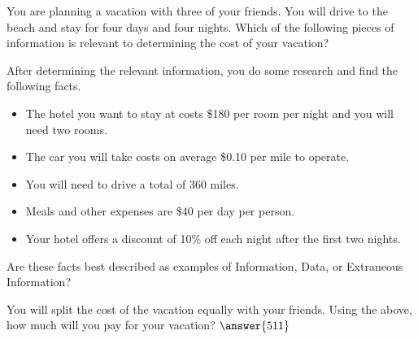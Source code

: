\documentclass{ximera}
\begin{document}
\begin{problem}
    You are planning a vacation with three of your friends.  You will drive to the beach and stay for four days and four nights.  Which of the following pieces of information is relevant to determining the cost of your vacation?
    \begin{selectAll}
    \end{selectAll}
    \begin{problem}
        After determining the relevant information, you do some research and find the following facts.
        \begin{itemize}
            \item The hotel you want to stay at costs \$180 per room per night and you will need two rooms.
            \item The car you will take costs on average \$0.10 per mile to operate.
            \item You will need to drive a total of 360 miles.
            \item Meals and other expenses are \$40 per day per person.
            \item Your hotel offers a discount of 10\% off each night after the first two nights.
        \end{itemize}
        Are these facts best described as examples of Information, Data, or Extraneous Information?
        \begin{multipleChoice}
        \end{multipleChoice}
    \end{problem}

    \begin{problem}
        You will split the cost of the vacation equally with your friends. Using the above, how much will you pay for your vacation?
        $\answer{511}$
    \end{problem}
\end{problem}
\end{document}
